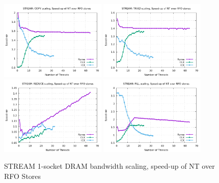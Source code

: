 \documentclass{article}
\begin{document}
\begin{figure}[!ht]
    \centering
    \includegraphics[width=0.45\textwidth]{../mem_bw_scale/mb_scale_compact_Copy_nt_rfo}
    \includegraphics[width=0.45\textwidth]{../mem_bw_scale/mb_scale_compact_Triad_nt_rfo}
    \includegraphics[width=0.45\textwidth]{../mem_bw_scale/mb_scale_compact_Reduce_nt_rfo}
    \includegraphics[width=0.45\textwidth]{../mem_bw_scale/mb_scale_compact_Fill_nt_rfo}
    \caption{STREAM 1-socket DRAM bandwidth scaling, speed-up of NT over RFO Stores}
    \label{figure:mem_bw_scale_compact_nt_rfo}
\end{figure}
\end{document}
